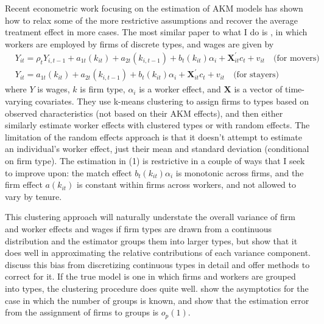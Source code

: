 \documentclass{article}
\begin{document}
Recent econometric work focusing on the estimation of AKM models has shown how to relax some of the more restrictive assumptions and recover the average treatment effect in more cases. The most similar paper to what I do is \citet*{bonhomme2019distributional}, in which workers are employed by firms of discrete types, and wages are given by 
\begin{align*}
    & Y_{i t}=\rho_{t} Y_{i, t-1}+a_{1 t}\left(k_{i t}\right)+a_{2 t}\left(k_{i, t-1}\right)+b_{t}\left(k_{i t}\right) \alpha_{i}+\mathbf{X}_{i t}^{\prime} c_{t}+v_{i t} \quad  \text{(for movers)}\\
    & Y_{i t}=a_{1 t}\left(k_{i t}\right)+a_{2 t}\left(k_{i, t-1}\right)+b_{t}\left(k_{i t}\right) \alpha_{i}+\mathbf{X}_{i t}^{\prime} c_{t}+v_{i t} \quad  \text{(for stayers)}
\end{align*}
where $Y$ is wages, $k$ is firm type, $\alpha_i$ is a worker effect, and $\mathbf{X}$ is a vector of time-varying covariates. They use k-means clustering to assign firms to types based on observed characteristics (not based on their AKM effects), and then either similarly estimate worker effects with clustered types or with random effects. The limitation of the random effects approach is that it doesn't attempt to estimate an individual's worker effect, just their mean and standard deviation (conditional on firm type). The estimation in (1) is restrictive in a couple of ways that I seek to improve upon: the match effect $b_{t}\left(k_{i t}\right) \alpha_{i}$ is monotonic across firms, and the firm effect $a(k_{it})$ is constant within firms across workers, and not allowed to vary by tenure.

This clustering approach will naturally understate the overall variance of firm and worker effects and wages if firm types are drawn from a continuous distribution and the estimator groups them into larger types, but \citet{bonhomme2022discretizing} show that it does well in approximating the relative contributions of each variance component. \citet{bonhomme2022discretizing} discuss this bias from discretizing continuous types in detail and offer methods to correct for it. If the true model is one in which firms and workers are grouped into types, the clustering procedure does quite well. \citet{bonhomme2015grouped} show the asymptotics for the case in which the number of groups is known, and show that the estimation error from the assignment of firms to groups is $o_p(1)$. %
\end{document}
